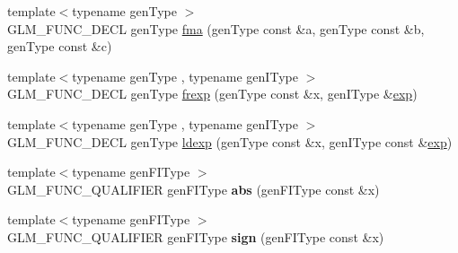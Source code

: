 \begin{DoxyCompactItemize}
\item 
{\footnotesize template$<$typename gen\+Type $>$ }\\G\+L\+M\+\_\+\+F\+U\+N\+C\+\_\+\+D\+E\+CL gen\+Type \hyperlink{group__core__func__common_gad0f444d4b81cc53c3b6edf5aa25078c2}{fma} (gen\+Type const \&a, gen\+Type const \&b, gen\+Type const \&c)
\item 
{\footnotesize template$<$typename gen\+Type , typename gen\+I\+Type $>$ }\\G\+L\+M\+\_\+\+F\+U\+N\+C\+\_\+\+D\+E\+CL gen\+Type \hyperlink{group__core__func__common_ga20620e83544d1a988857a3bc4ebe0e1d}{frexp} (gen\+Type const \&x, gen\+I\+Type \&\hyperlink{group__core__func__exponential_gae154699ba6bda068d4b87cf9b987381f}{exp})
\item 
{\footnotesize template$<$typename gen\+Type , typename gen\+I\+Type $>$ }\\G\+L\+M\+\_\+\+F\+U\+N\+C\+\_\+\+D\+E\+CL gen\+Type \hyperlink{group__core__func__common_ga52e319d7289b849ec92055abd4830533}{ldexp} (gen\+Type const \&x, gen\+I\+Type const \&\hyperlink{group__core__func__exponential_gae154699ba6bda068d4b87cf9b987381f}{exp})
\item 
{\footnotesize template$<$typename gen\+F\+I\+Type $>$ }\\G\+L\+M\+\_\+\+F\+U\+N\+C\+\_\+\+Q\+U\+A\+L\+I\+F\+I\+ER gen\+F\+I\+Type {\bfseries abs} (gen\+F\+I\+Type const \&x)\hypertarget{namespaceglm_a5c82b1e2a9cb12b4a70d22a8f987273d}{}\label{namespaceglm_a5c82b1e2a9cb12b4a70d22a8f987273d}

\item 
{\footnotesize template$<$typename gen\+F\+I\+Type $>$ }\\G\+L\+M\+\_\+\+F\+U\+N\+C\+\_\+\+Q\+U\+A\+L\+I\+F\+I\+ER gen\+F\+I\+Type {\bfseries sign} (gen\+F\+I\+Type const \&x)\hypertarget{namespaceglm_aaa1babcfcb872aa6bf5e701c20ac4fda}{}\label{namespaceglm_aaa1babcfcb872aa6bf5e701c20ac4fda}


\end{DoxyCompactItemize}
